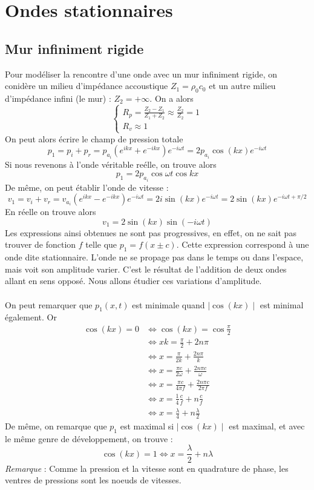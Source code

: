 \section{Ondes stationnaires}
\subsection{Mur infiniment rigide}
Pour modéliser la rencontre d'une onde avec un mur infiniment rigide, on conidère un milieu d'impédance accoustique $Z_1=\rho_0c_0$ et un autre milieu d'impédance infini (le mur) : $Z_2=+\infty$. On a alors
\[
\left\{
\begin{array}{l}
R_p=\frac{Z_2-Z_1}{Z_1+Z_2}\approx\frac{Z_2}{Z_2}=1 \\
R_v\approx1
\end{array}
\right.
\]
On peut alors écrire le champ de pression totale 
\[ p_1=p_i+p_r=p_{a_i}(e^{ikx}+e^{-ikx})e^{-i\omega t}=2p_{a_i}\cos (kx) e^{-i\omega t} \]
Si nous revenons à l'onde véritable reélle, on trouve alors
\[ p_1=2p_{a_i}\cos\omega t\cos kx \]
De même, on peut établir l'onde de vitesse :
\[ v_1=v_i+v_r=v_{a_i}(e^{ikx}-e^{-ikx})e^{-i\omega t}=2i\sin (kx) e^{-i\omega t}=2\sin (kx) e^{-i\omega t+\pi/2} \]
En réelle on trouve alors 
\[ v_1=2\sin (kx)\sin(-i\omega t) \]
Les expressions ainsi obtenues ne sont pas progressives, en effet, on ne sait pas trouver de fonction $f$ telle que $p_1=f(x\pm c)$. Cette expression correspond à une onde dite stationnaire. L'onde ne se propage pas dans le temps ou dans l'espace, mais voit son amplitude varier. C'est le résultat de l'addition de deux ondes allant en sens opposé. Nous allons étudier ces variations d'amplitude. \\\\
On peut remarquer que $p_1(x,t)$ est minimale quand $\mid\cos(kx)\mid$ est minimal également. Or
\[ 
\begin{array}{ll}
\cos(kx)=0 &\Leftrightarrow \cos(kx)=\cos{\frac{\pi}{2}} \\
& \Leftrightarrow xk=\frac{\pi}{2}+2n\pi \\
& \Leftrightarrow x=\frac{\pi}{2k}+\frac{2n\pi}{k} \\
& \Leftrightarrow x=\frac{\pi c}{2\omega}+\frac{2n\pi c}{\omega} \\
& \Leftrightarrow x=\frac{\pi c}{4\pi f}+\frac{2n\pi c}{2\pi f} \\
& \Leftrightarrow x=\frac{1}{4}\frac{c}{f}+n\frac{c}{f} \\
& \Leftrightarrow x=\frac{\lambda}{4}+n\frac{\lambda}{2}
\end{array}
\]
De même, on remarque que $p_1$ est maximal si $\mid\cos(kx)\mid$ est maximal, et avec le même genre de développement, on trouve :
\[ \cos(kx)=1\Leftrightarrow x=\frac{\lambda}{2}+n\lambda \]
\emph{Remarque} : Comme la pression et la vitesse sont en quadrature de phase, les ventres de pressions sont les noeuds de vitesses.
